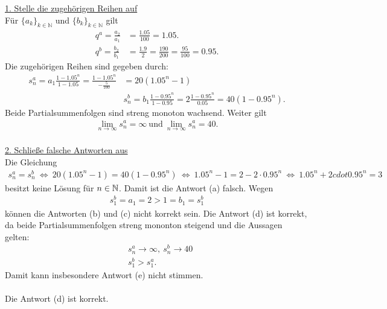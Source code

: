 \underline{1. Stelle die zugehörigen Reihen auf}\\
Für $\{a_k\}_{k \in \mathbb{N}}$ und $\{b_k\}_{k \in \mathbb{N}}$ gilt
\begin{align*}
	q^a = \frac{a_2}{a_1} &= \frac{1.05}{100} = 1.05.\\
	q^b = \frac{b_2}{b_1} &= \frac{1.9}{2} = \frac{190}{200} = \frac{95}{100} = 0.95.
\end{align*}
Die zugehörigen Reihen sind gegeben durch:
\begin{align*}
	s_n^a = a_1 \frac{1 - 1.05^n}{1- 1.05} = \frac{1- 1.05^n}{-\frac{5}{100}}
	&= 20 (1.05^n - 1)\\
	&s_n^b = b_1 \frac{1 - 0.95^n}{1- 0.95} = 2 \frac{1-0.95^n}{0.05} = 40 (1- 0.95^n).
\end{align*}
Beide Partialsummenfolgen sind streng monoton wachsend. Weiter gilt
\begin{align*}
	\lim \limits_{n \to \infty} s_n^a = \infty \ \textrm{und} \
	\lim \limits_{n \to \infty} s_n^a = 40.
\end{align*}
\ \\
\underline{2. Schließe falsche Antworten aus}\\
Die Gleichung
\begin{align*}
	s_n^a = s_n^b 
	\ \Leftrightarrow \
	20 (1.05^n - 1) = 40 (1- 0.95^n)
	\ \Leftrightarrow \ 
	1.05^n - 1 = 2 - 2 \cdot 0.95^n
	\ \Leftrightarrow \
	1.05^n + 2 cdot  0.95^n = 3
\end{align*}
besitzt keine Lösung für $n \in \mathbb{N}$. Damit ist die Antwort (a) falsch.
Wegen
\begin{align*}
	s_1^b  = a_1 =  2 > 1 = b_1 = s_1^b
\end{align*}
können die Antworten (b) und (c) nicht korrekt sein. Die Antwort (d) ist korrekt, da
beide Partialsummenfolgen streng mononton steigend und die Aussagen gelten:
\begin{align*}
	&s_n^a \to \infty, \ s_n^b \to 40\\
	&s_1^b  > s_1^a. 
\end{align*}
Damit kann insbesondere Antwort (e) nicht stimmen.\\
\\
Die Antwort (d) ist korrekt.
\newpage


